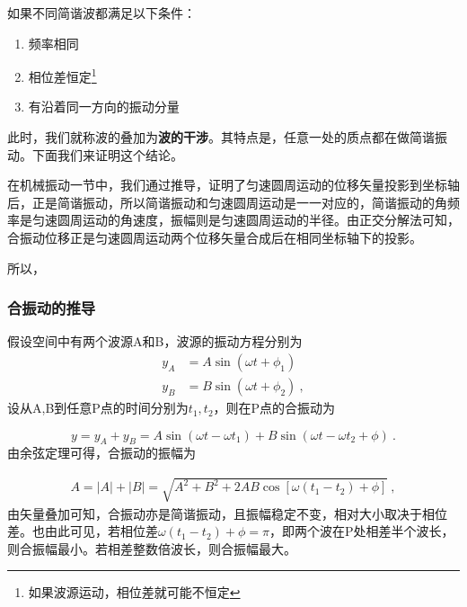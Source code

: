 如果不同简谐波都满足以下条件：
\begin{enumerate}
\item 频率相同
\item 相位差恒定\footnote{如果波源运动，相位差就可能不恒定}
\item 有沿着同一方向的振动分量
\end{enumerate}
此时，我们就称波的叠加为\textbf{波的干涉}。其特点是，任意一处的质点都在做简谐振动。下面我们来证明这个结论。



在机械振动一节中，我们通过推导，证明了匀速圆周运动的位移矢量投影到坐标轴后，正是简谐振动，所以简谐振动和匀速圆周运动是一一对应的，简谐振动的角频率是匀速圆周运动的角速度，振幅则是匀速圆周运动的半径。由正交分解法可知，合振动位移正是匀速圆周运动两个位移矢量合成后在相同坐标轴下的投影。

所以，
\subsubsection{合振动的推导}
假设空间中有两个波源A和B，波源的振动方程分别为
\begin{equation}
\begin{aligned}
y_A&=A\sin(\omega t+\phi_1)\\
y_B&=B\sin (\omega t+\phi_2)~,
\end{aligned}
\end{equation}
设从A,B到任意P点的时间分别为$t_1,t_2$，则在P点的合振动为

\begin{equation}
y=y_A+y_B=A\sin(\omega t-\omega t_1)+B\sin(\omega t-\omega t_2+\phi)~.
\end{equation}
由余弦定理可得，合振动的振幅为

\begin{equation}
\begin{aligned}
A=|A|+|B|=\sqrt{A^2+B^2+2AB\cos[\omega(t_1-t_2)+\phi]}~,
\end{aligned}
\end{equation}
由矢量叠加可知，合振动亦是简谐振动，且振幅稳定不变，相对大小取决于相位差。也由此可见，若相位差$\omega(t_1-t_2)+\phi=\pi$，即两个波在P处相差半个波长，则合振幅最小。若相差整数倍波长，则合振幅最大。